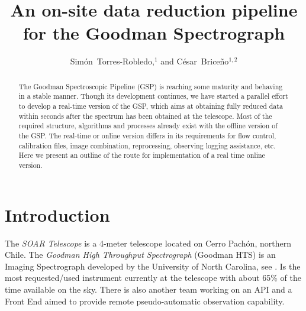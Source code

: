 \documentclass[11pt,twoside]{article}
\begin{document}
\title{An on-site data reduction pipeline for the Goodman Spectrograph}


\author{Sim\'on~Torres-Robledo,$^1$ and C\'esar~Brice\~no$^{1,2}$
  }           %



  
\begin{abstract}

The Goodman Spectroscopic Pipeline (GSP) is reaching some maturity and
behaving in a stable manner. Though its development continues, we have
started a parallel effort to develop a real-time version of the GSP,
which aims at obtaining fully reduced data within seconds after the spectrum
has been obtained at the telescope.  Most of the required structure, algorithms and
processes already exist with the offline version of the GSP. The real-time or online
version differs in its requirements for flow control, calibration files, image combination, reprocessing, observing logging assistance, etc.
Here we present an outline of the route for implementation of a real time online version.
  
\end{abstract}

\section{Introduction}

The \emph{SOAR Telescope} is a 4-meter telescope located on Cerro Pach\'on, northern Chile. The \emph{Goodman High Throughput Spectrograph} (Goodman HTS) is an Imaging Spectrograph developed by the University of North Carolina, see \citet{2004SPIE.5492..331C}. Is the most requested/used instrument currently at the telescope with about 65\% of the time available on the sky. There is also another team working on an API and a Front End aimed to provide remote pseudo-automatic observation capability.
\end{document}
